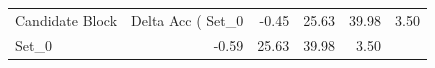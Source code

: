 \begin{tabular}{lrrrr}
\toprule
Candidate Block & Delta Acc (%
\midrule
Set_0 & -0.45 & 25.63 & 39.98 & 3.50 \\
Set_0 & -0.59 & 25.63 & 39.98 & 3.50 \\
\bottomrule
\end{tabular}
